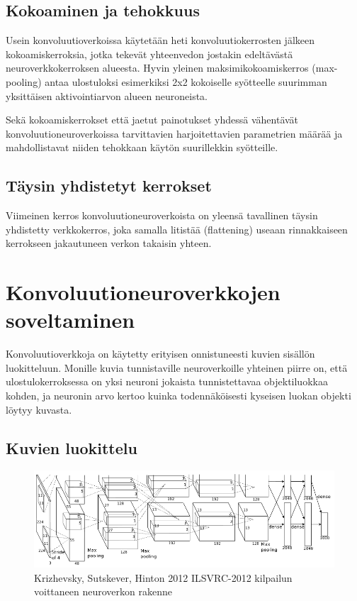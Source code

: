 \documentclass[finnish]{tktltiki2}
\theoremstyle{definition}
\theoremstyle{remark}
\begin{document}
    \subsection{Kokoaminen ja tehokkuus}
    Usein konvoluutioverkoissa käytetään heti konvoluutiokerrosten jälkeen kokoamiskerroksia, jotka tekevät yhteenvedon jostakin edeltävästä neuroverkkokerroksen alueesta. Hyvin yleinen maksimikokoamiskerros (max-pooling) antaa ulostuloksi esimerkiksi 2x2 kokoiselle syötteelle suurimman yksittäisen aktivointiarvon alueen neuroneista.

    Sekä kokoamiskerrokset että jaetut painotukset yhdessä vähentävät konvoluutioneuroverkoissa tarvittavien harjoitettavien parametrien määrää ja mahdollistavat niiden tehokkaan käytön suurillekkin syötteille.

    \subsection{Täysin yhdistetyt kerrokset}
    Viimeinen kerros konvoluutioneuroverkoista on yleensä tavallinen täysin yhdistetty verkkokerros, joka samalla litistää (flattening) useaan rinnakkaiseen kerrokseen jakautuneen verkon takaisin yhteen.

  \section{Konvoluutioneuroverkkojen soveltaminen}
    Konvoluutioverkkoja on käytetty erityisen onnistuneesti kuvien sisällön luokitteluun. Monille kuvia tunnistaville neuroverkoille yhteinen piirre on, että ulostulokerroksessa on yksi neuroni jokaista tunnistettavaa objektiluokkaa kohden, ja neuronin arvo kertoo kuinka todennäköisesti kyseisen luokan objekti löytyy kuvasta.

  \subsection{Kuvien luokittelu}

    \begin{figure}[h]
    \label{pic:convolution}
    \centering
    \includegraphics[scale=0.4]{imagenet}
    \caption{Krizhevsky, Sutskever, Hinton 2012 ILSVRC-2012 kilpailun voittaneen neuroverkon rakenne \cite{KSHimagenet2012}}
    \end{figure}
\end{document}
